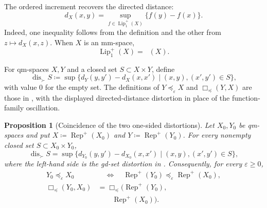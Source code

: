 \documentclass{amsart}
\theoremstyle{plain}
\newtheorem{proposition}[theorem]{Proposition}
\theoremstyle{definition}
\theoremstyle{remark}
\newcommand{\lipplus}{\operatorname{Lip}^{+}_{1}}
\DeclareMathOperator{\lipone}{Lip_1}
\DeclareMathOperator{\dis}{dis}
\begin{document}
The ordered increment recovers the directed distance:
\begin{equation}
\label{eq:directed-recovery}
d_X(x,y)=\sup_{f\in\lipplus(X)}\{f(y)-f(x)\}.
\end{equation}
Indeed, one inequality follows from the definition and the other from
$z\mapsto d_X(x,z)$.  When $X$ is an mm-space,
\begin{equation} \label{eq:symmetric-directed-lipschitz} \lipplus(X)=\lipone(X). \end{equation}

For qm-spaces $X,Y$ and a closed set $S\subset X\times Y$, define
\[ \dis_{\succ}S\coloneqq \sup\{d_Y(y,y')-d_X(x,x')\mid(x,y),(x',y')\in S\}, \]
with value $0$ for the empty set.  The definitions of
$Y\preceq_\varepsilon X$ and $\Box_{\preceq}(Y,X)$ are those in
, with the displayed directed-distance
distortion in place of the function-family oscillation.

\begin{proposition}[Coincidence of the two one-sided distortions]
\label{prop:directed-distortion-coincidence}
Let $X_0,Y_0$ be qm-spaces and put
$X\coloneqq\operatorname{Rep}^{+}(X_0)$ and $Y\coloneqq\operatorname{Rep}^{+}(Y_0)$.  For
every nonempty closed set $S\subset X_0\times Y_0$,
\begin{equation}
\label{eq:directed-distortion-coincidence}
\dis_{\succ}S=
\sup\{d_{Y_0}(y,y')-d_{X_0}(x,x')\mid
(x,y),(x',y')\in S\},
\end{equation}
where the left-hand side is the gd-set distortion in
.  Consequently, for every
$\varepsilon\geq0$,
\[
\begin{aligned}
Y_0\preceq_\varepsilon X_0
&\quad\Longleftrightarrow\quad
\operatorname{Rep}^{+}(Y_0)\preceq_\varepsilon\operatorname{Rep}^{+}(X_0),\\
\Box_{\preceq}(Y_0,X_0) &=\Box_{\preceq}\bigl(\operatorname{Rep}^{+}(Y_0),\\
&\qquad\operatorname{Rep}^{+}(X_0)\bigr).
\end{aligned}
\]
\end{proposition}
\end{document}
